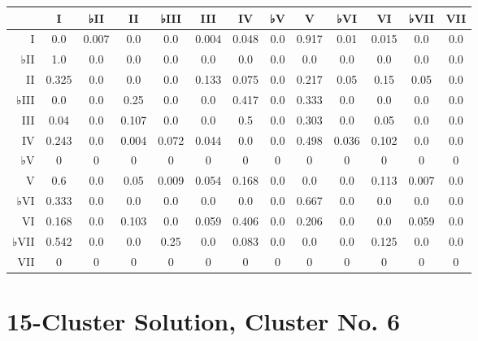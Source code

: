 \begin{table}[htbp]
\begin{minipage}{\linewidth}
\setlength{\tymax}{0.5\linewidth}
\centering
\small
\begin{tabulary}{\textwidth}{@{}RCCCCCCCCCCCC@{}} \toprule
&I&♭II&II&♭III&III&IV&♭V&V&♭VI&VI&♭VII&VII\\
\midrule
I&0.0&0.007&0.0&0.0&0.004&0.048&0.0&0.917&0.01&0.015&0.0&0.0\\
♭II&1.0&0.0&0.0&0.0&0.0&0.0&0.0&0.0&0.0&0.0&0.0&0.0\\
II&0.325&0.0&0.0&0.0&0.133&0.075&0.0&0.217&0.05&0.15&0.05&0.0\\
♭III&0.0&0.0&0.25&0.0&0.0&0.417&0.0&0.333&0.0&0.0&0.0&0.0\\
III&0.04&0.0&0.107&0.0&0.0&0.5&0.0&0.303&0.0&0.05&0.0&0.0\\
IV&0.243&0.0&0.004&0.072&0.044&0.0&0.0&0.498&0.036&0.102&0.0&0.0\\
♭V&0&0&0&0&0&0&0&0&0&0&0&0\\
V&0.6&0.0&0.05&0.009&0.054&0.168&0.0&0.0&0.0&0.113&0.007&0.0\\
♭VI&0.333&0.0&0.0&0.0&0.0&0.0&0.0&0.667&0.0&0.0&0.0&0.0\\
VI&0.168&0.0&0.103&0.0&0.059&0.406&0.0&0.206&0.0&0.0&0.059&0.0\\
♭VII&0.542&0.0&0.0&0.25&0.0&0.083&0.0&0.0&0.0&0.125&0.0&0.0\\
VII&0&0&0&0&0&0&0&0&0&0&0&0\\

\bottomrule

\end{tabulary}
\end{minipage}
\end{table}

\section{15-Cluster Solution, Cluster No. 6}
\label{15-clustersolutionclusterno.6}

